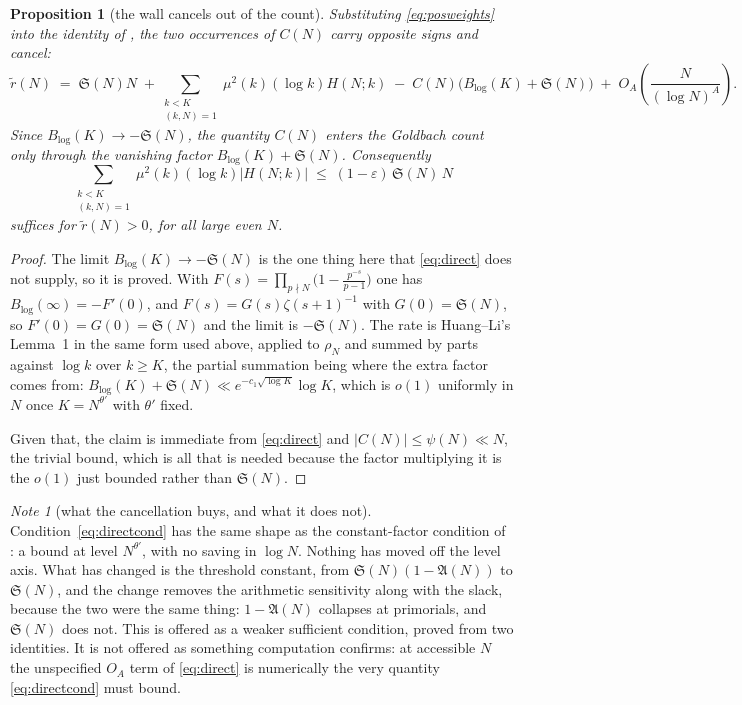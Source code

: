 \documentclass[11pt,a4paper]{article}
\theoremstyle{plain}
\newtheorem{proposition}[theorem]{Proposition}
\theoremstyle{definition}
\theoremstyle{remark}
\newtheorem{note}[theorem]{Note}
\renewcommand{\SS}{\mathfrak{S}}
\newcommand{\AAA}{\mathfrak{A}}
\begin{document}
\begin{proposition}[the wall cancels out of the count]%
\label{prop:direct}
Substituting \eqref{eq:posweights} into the identity of \cite[Theorem on the identity]{P1},
the two occurrences of $C(N)$ carry opposite signs and cancel:
\begin{equation}\label{eq:direct}
  \tilde r(N)\;=\;\SS(N)N
   \;+\!\!\sum_{\substack{k<K\\(k,N)=1}}\!\!\mu^2(k)(\log k)H(N;k)
   \;-\;C(N)\bigl(B_{\log}(K)+\SS(N)\bigr)
   \;+\;O_A\!\left(\frac{N}{(\log N)^{A}}\right).
\end{equation}
Since $B_{\log}(K)\to-\SS(N)$, the quantity $C(N)$ enters the Goldbach
count only through the vanishing factor $B_{\log}(K)+\SS(N)$.
Consequently
\begin{equation}\label{eq:directcond}
  \sum_{\substack{k<K\\(k,N)=1}}\mu^2(k)(\log k)\bigl|H(N;k)\bigr|
   \;\le\;(1-\varepsilon)\,\SS(N)\,N
\end{equation}
suffices for $\tilde r(N)>0$, for all large even $N$.
\end{proposition}

\begin{proof}
The limit $B_{\log}(K)\to-\SS(N)$ is the one thing here that
\eqref{eq:direct} does not supply, so it is proved. With
$F(s)=\prod_{p\nmid N}\bigl(1-\tfrac{p^{-s}}{p-1}\bigr)$ one has
$B_{\log}(\infty)=-F'(0)$, and $F(s)=G(s)\zeta(s+1)^{-1}$ with
$G(0)=\SS(N)$, so $F'(0)=G(0)=\SS(N)$ and the limit is $-\SS(N)$. The
rate is Huang--Li's Lemma~1 in the same form used above, applied to
$\rho_N$ and summed by parts against $\log k$ over $k\ge K$, the
partial summation being where the extra factor comes from:
$B_{\log}(K)+\SS(N)\ll e^{-c_1\sqrt{\log K}}\log K$, which is $o(1)$
uniformly in $N$ once $K=N^{\theta'}$ with $\theta'$ fixed.

Given that, the claim is immediate from \eqref{eq:direct} and
$|C(N)|\le\psi(N)\ll N$, the trivial bound, which is all that is needed
because the factor multiplying it is the $o(1)$ just bounded rather
than $\SS(N)$.
\end{proof}

\begin{note}[what the cancellation buys, and what it does not]
Condition~\eqref{eq:directcond} has the same shape as the
constant-factor condition of \cite[Proposition on the constant-factor demand]{P1}: a bound at level
$N^{\theta'}$, with no saving in $\log N$. Nothing has moved off the
level axis. What has changed is the threshold constant, from
$\SS(N)(1-\AAA(N))$ to $\SS(N)$, and the change removes the arithmetic
sensitivity along with the slack, because the two were the same thing:
$1-\AAA(N)$ collapses at primorials, and $\SS(N)$ does not. This is
offered as a weaker sufficient condition, proved from two identities.
It is not offered as something computation confirms: at accessible $N$
the unspecified $O_A$ term of \eqref{eq:direct} is numerically the
very quantity \eqref{eq:directcond} must bound.
\end{note}
\end{document}
